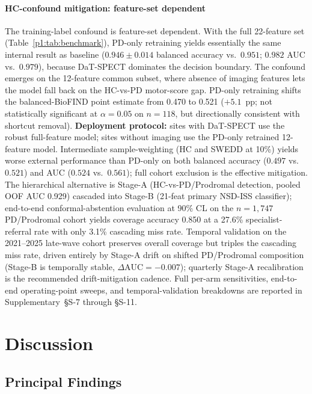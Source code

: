 \paragraph*{HC-confound mitigation: feature-set dependent} The training-label confound is feature-set dependent. With the full 22-feature set (Table~\ref{p1:tab:benchmark}), PD-only retraining yields essentially the same internal result as baseline ($0.946 \pm 0.014$ balanced accuracy vs.\ $0.951$; $0.982$ AUC vs.\ $0.979$), because DaT-SPECT dominates the decision boundary. The confound emerges on the 12-feature common subset, where absence of imaging features lets the model fall back on the HC-vs-PD motor-score gap. PD-only retraining shifts the balanced-BioFIND point estimate from 0.470 to 0.521 ($+5.1$~pp; not statistically significant at $\alpha{=}0.05$ on $n{=}118$, but directionally consistent with shortcut removal). \textbf{Deployment protocol:} sites with DaT-SPECT use the robust full-feature model; sites without imaging use the PD-only retrained 12-feature model. Intermediate sample-weighting (HC and SWEDD at 10\%) yields worse external performance than PD-only on both balanced accuracy ($0.497$ vs.\ $0.521$) and AUC ($0.524$ vs.\ $0.561$); full cohort exclusion is the effective mitigation. The hierarchical alternative is Stage-A (HC-vs-PD/Prodromal detection, pooled OOF AUC 0.929) cascaded into Stage-B (21-feat primary NSD-ISS classifier); end-to-end conformal-abstention evaluation at 90\% CL on the $n{=}1{,}747$ PD/Prodromal cohort yields coverage accuracy 0.850 at a 27.6\% specialist-referral rate with only 3.1\% cascading miss rate. Temporal validation on the 2021--2025 late-wave cohort preserves overall coverage but triples the cascading miss rate, driven entirely by Stage-A drift on shifted PD/Prodromal composition (Stage-B is temporally stable, $\Delta\mathrm{AUC}{=}{-}0.007$); quarterly Stage-A recalibration is the recommended drift-mitigation cadence. Full per-arm sensitivities, end-to-end operating-point sweeps, and temporal-validation breakdowns are reported in Supplementary~\S{}S-7 through \S{}S-11.

\section{Discussion}
\label{p1:sec:discussion}

\subsection{Principal Findings}

